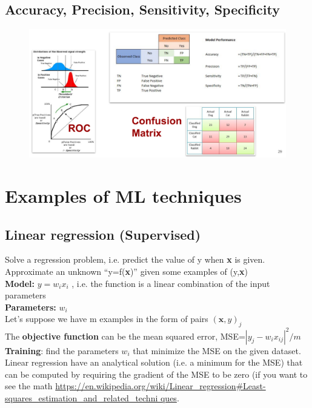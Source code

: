 \subsection{Accuracy, Precision, Sensitivity, Specificity}

\begin{figure}[ht]
	\centering
	\includegraphics[width=1\textwidth]{figure_ml/apss.png}
\end{figure}
\FloatBarrier


\section{Examples of ML techniques}

\subsection{Linear regression (Supervised)}

Solve a regression problem, i.e. predict the value of y when \textbf{x} is given. Approximate an unknown “y=f(\textbf{x})” given some examples of (y,\textbf{x})\\

\textbf{Model:} $y=w_ix_i$ , i.e. the function is a linear combination of the input parameters\\

\textbf{Parameters:} $ w_i$\\

Let’s suppose we have m examples in the form of pairs $(\textbf{x},y)_j$\\

The \textbf{objective function} can be the mean squared error, MSE=$|y_j - w_i x_{ij} |^2/m$\\

\textbf{Training}: find the parameters $w_i$ that minimize the MSE on the given dataset. Linear regression have an analytical solution (i.e. a minimum for the MSE) that can be computed by requiring the gradient of the MSE to be zero (if you want to see the math \url{https://en.wikipedia.org/wiki/Linear_regression#Least-squares_estimation_and_related_techni
	ques}.

